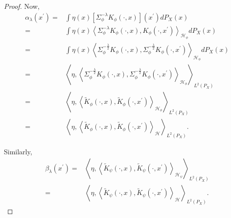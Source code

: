 \documentclass{article}
\theoremstyle{plain}
\newcommand{\Hil}{\mathcal{H}}
\newcommand{\repone}{\phi}
\newcommand{\reptwo}{\psi}
\newcommand{\Hone}{\mathcal{H}_{\phi}}
\newcommand{\Htwo}{\mathcal{H}_{\psi}}
\newcommand{\inprod}[1]{\left \langle #1 \right\rangle}
\newcommand{\LPtwo}{L^{2}(P_{X})}
\begin{document}
\begin{proof}
Now, 
\[
\begin{aligned}
    \alpha_{\lambda}(x^{\prime}) = &\int \eta(x) \left[\Sigma_{\repone}^{-\lambda}K_{\repone}(\cdot,x)\right](x^{\prime})dP_{X}(x)\\
    = &\int \eta(x) \inprod{\Sigma_{\repone}^{-\lambda}K_{\repone}(\cdot,x),K_{\repone}(\cdot,x^{\prime})}_{\Hone}dP_{X}(x)\\
    = &\int \eta(x) \inprod{\Sigma_{\repone}^{-\frac{\lambda}{2}}K_{\repone}(\cdot,x),\Sigma_{\repone}^{-\frac{\lambda}{2}}K_{\repone}(\cdot,x^{\prime})}_{\Hone}dP_{X}(x)\\
    = & \inprod{\eta,\inprod{\Sigma_{\repone}^{-\frac{\lambda}{2}}K_{\repone}(\cdot,x),\Sigma_{\repone}^{-\frac{\lambda}{2}}K_{\repone}(\cdot,x^{\prime})}_{\Hone}}_{\LPtwo}\\
    = & \inprod{\eta,\inprod{\widetilde{K}_{\repone}(\cdot,x),\widetilde{K}_{\repone}(\cdot,x^{\prime})}_{\Hone}}_{\LPtwo}\\
     = & \inprod{\eta,\inprod{\widetilde{K}_{\repone}(\cdot,x),\widetilde{K}_{\repone}(\cdot,x^{\prime})}_{\Hil}}_{\LPtwo}.
\end{aligned}
\]

Similarly,
\[
\begin{aligned}
    \beta_{\lambda}(x^{\prime}) = & \inprod{\eta,\inprod{\widetilde{K}_{\reptwo}(\cdot,x),\widetilde{K}_{\reptwo}(\cdot,x^{\prime})}_{\Htwo}}_{\LPtwo}\\
     = & \inprod{\eta,\inprod{\widetilde{K}_{\reptwo}(\cdot,x),\widetilde{K}_{\reptwo}(\cdot,x^{\prime})}_{\Hil}}_{\LPtwo}.
\end{aligned}
\]


\end{proof}
\end{document}
